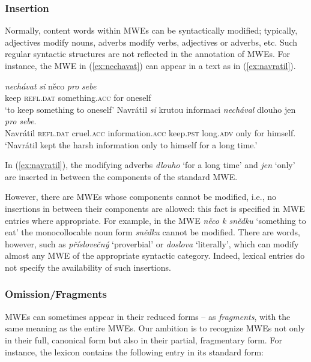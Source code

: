 \documentclass[output=paper,colorlinks,citecolor=brown]{langscibook}
\begin{document}
\subsubsection{Insertion}
\label{variability-insertion}
Normally, content words within MWEs can be syntactically modified; typically, adjectives modify nouns, adverbs modify verbs, adjectives or adverbs, etc. Such regular syntactic structures are not reflected in the annotation of MWEs. For instance, the MWE in (\ref{ex:nechavat}) can appear in a text as in (\ref{ex:navratil}).

\ea
\ea \label{ex:nechavat}
\gll \emph{nechávat} \emph{si} něco \emph{pro} \emph{sebe}\\
     keep \textsc{refl.dat} something.\textsc{acc} for oneself\\
\glt `to keep something to oneself'
\ex \label{ex:navratil}
\gll Navrátil \emph{si} krutou informaci \emph{nechával} dlouho jen \emph{pro} \emph{sebe}.\\
     Navrátil \textsc{refl.dat} cruel.\textsc{acc} information.\textsc{acc} keep.\textsc{pst} long.\textsc{adv} only for himself.\\
\glt `Navrátil kept the harsh information only to himself for a long time.'
\z
\z

\noindent
In (\ref{ex:navratil}), the modifying adverbs \emph{dlouho} ‘for a long time’ and \emph{jen} ‘only’ are inserted in between the components of the standard MWE.

However, there are MWEs whose components cannot be modified, i.e., no insertions in between their components are allowed: this fact is specified in MWE entries where appropriate. For example, in the MWE \emph{něco k snědku} `something to eat' the monocollocable noun form \emph{snědku} cannot be modified. There are words, however, such as \emph{příslovečný} `proverbial' or \emph{doslova} `literally', which can modify almost any MWE of the appropriate syntactic category. Indeed, lexical entries do not specify the availability of such insertions.

\subsubsection{Omission/Fragments}
\label{variability-omission}
MWEs can sometimes appear in their reduced forms -- as \textit{fragments}, with the same meaning as the entire MWEs. Our ambition is to recognize MWEs not only in their full, canonical form but also in their partial, fragmentary form. For instance, the lexicon contains the following entry in its standard form:
\end{document}
